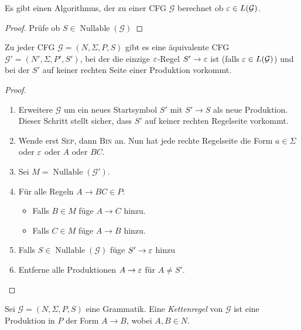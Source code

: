 \begin{Korollar}
  Es gibt einen Algorithmus, der zu einer CFG $\mathcal{G}$ berechnet ob $\varepsilon \in L(\mathcal{G})$.
\end{Korollar}
\begin{proof}
  Prüfe ob $S \in \operatorname{Nullable}(\mathcal{G})$
\end{proof}
\begin{lemma}
  Zu jeder CFG $\mathcal{G}=(N, \Sigma, P, S)$ gibt es eine äquivalente CFG $\mathcal{G'} =(N', \Sigma, P', S')$, bei der die einzige $\varepsilon$-Regel $S' \to \varepsilon$ ist (falls $\varepsilon \in L(\mathcal{G})$) und bei der $S'$ auf keiner rechten Seite einer Produktion vorkommt.
\end{lemma}
\begin{proof}
  \hfill
  \begin{enumerate}
  \item Erweitere $\mathcal{G}$ um ein neues Startsymbol $S'$ mit $S' \to S$ als neue Produktion.
    Dieser Schritt stellt sicher, dass $S'$ auf keiner rechten Regelseite vorkommt.
  \item Wende erst \textsc{Sep}, dann \textsc{Bin} an.
    Nun hat jede rechte Regelseite die Form $a \in \Sigma$ oder $\varepsilon$ oder $A$ oder $BC$.
  \item Sei $M = \operatorname{Nullable}(\mathcal{G}')$.
  \item Für alle Regeln $A \to BC \in P$:
    \begin{itemize}
    \item Falls $B \in M$ füge $A \to C$ hinzu.
    \item Falls $C \in M$ füge $A \to B$ hinzu.
    \end{itemize}
  \item Falls $S \in \operatorname{Nullable}(\mathcal{G})$ füge $S' \to \varepsilon$ hinzu
  \item Entferne alle Produktionen $A \to \varepsilon$ für $A \neq S'$.
  \end{enumerate}
\end{proof}

\begin{Def}
  Sei $\mathcal{G} = (N, \Sigma, P, S)$ eine Grammatik.
  Eine \emph{Kettenregel} von $\mathcal{G}$ ist eine Produktion in $P$ der Form $A \to B$, wobei $A,B \in N$.
\end{Def}

